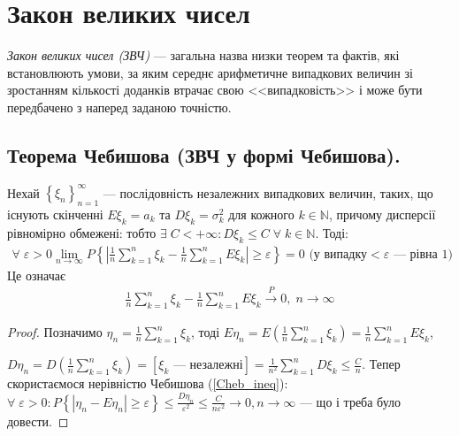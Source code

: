 \section{Закон великих чисел}
\emph{Закон великих чисел (ЗВЧ)} --- загальна назва низки теорем та фактів, які встановлюють умови, 
за яким середнє арифметичне випадкових величин зі зростанням кількості доданків втрачає 
свою <<випадковість>> і може бути передбачено з наперед заданою точністю.

\subsection{Теорема Чебишова (ЗВЧ у формі Чебишова).}

\begin{theorem*}
    Нехай $\left\{ \xi_n\right\}_{n=1}^{\infty}$ --- послідовність незалежних випадкових величин, 
    таких, що існують скінченні $E\xi_k = a_k$ та $D\xi_k = \sigma_k^2$ для кожного $k \in \mathbb{N}$,
    причому дисперсії рівномірно 
    обмежені: тобто $\exists\; C < +\infty : D\xi_k \leq C \;\forall\; k \in \mathbb{N}$. 
    Тоді:
    \begin{gather}
        \forall \; \varepsilon > 0 \lim_{n \rightarrow \infty} P\left\{\left|
            \frac{1}{n}\sum\limits_{k=1}^n \xi_k - \frac{1}{n}\sum\limits_{k=1}^n E\xi_k 
        \right| \geq \varepsilon\right\} = 0 \text{ (у випадку} < \varepsilon\text{ --- рівна 1)}
    \end{gather}
    Це означає
    \begin{gather}
        \frac{1}{n}\sum\limits_{k=1}^n \xi_k - \frac{1}{n}\sum\limits_{k=1}^n E\xi_k \overset{P}{\longrightarrow} 0, \; n \to \infty
    \end{gather}
\end{theorem*}
\begin{proof}
    Позначимо $\eta_n = \frac{1}{n}\sum\limits_{k=1}^n \xi_k$, тоді $E\eta_n = E\left(\frac{1}{n}\sum\limits_{k=1}^n \xi_k \right) = \frac{1}{n}\sum\limits_{k=1}^n E\xi_k$,

    \noindent$D\eta_n = D\left( \frac{1}{n}\sum\limits_{k=1}^n \xi_k\right) = \left[\xi_k \text{ --- незалежні} \right] = \frac{1}{n^2}\sum\limits_{k=1}^n D\xi_k \leq \frac{C}{n}$.
    Тепер скористаємося нерівністю Чебишова (\ref{Cheb_ineq}): 
    $\forall \; \varepsilon >0 : P\left\{ \left|\eta_n - E\eta_n \right| \geq \varepsilon\right\} \leq \frac{D\eta_n}{\varepsilon^2} \leq \frac{C}{n \varepsilon^2} \to 0, n\to\infty$
    --- що і треба було довести.
\end{proof}
